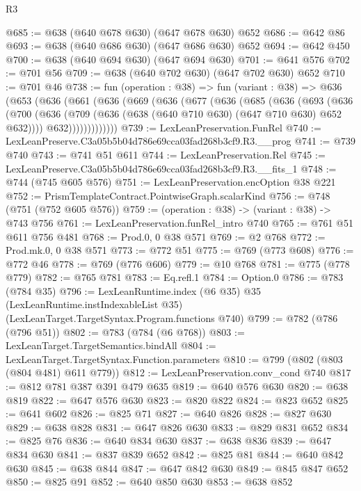 \begin{lexlean}{R3}
\begin{coremodule}
@685 := @638 (@640 @678 @630) (@647 @678 @630) @652
@686 := @642 @86
@693 := @638 (@640 @686 @630) (@647 @686 @630) @652
@694 := @642 @450
@700 := @638 (@640 @694 @630) (@647 @694 @630)
@701 := @641 @576
@702 := @701 @56
@709 := @638 (@640 @702 @630) (@647 @702 @630) @652
@710 := @701 @46
@738 := fun (operation : @38) =>
  fun (variant : @38) =>
  @636
    (@653
      (@636
        (@661
          (@636
            (@669
              (@636
                (@677
                  (@636
                    (@685
                      (@636
                        (@693
                          (@636
                            (@700
                              (@636
                                (@709 (@636 (@638 (@640 @710 @630) (@647 @710 @630) @652 @632))))
                              @632)))))))))))))
@739 := LexLeanPreservation.FunRel
@740 := LexLeanPreserve.C3a05b5b04d786e69cca03fad268b3cf9.R3.__prog
@741 := @739 @740
@743 := @741 @51 @611
@744 := LexLeanPreservation.Rel
@745 := LexLeanPreserve.C3a05b5b04d786e69cca03fad268b3cf9.R3.__fits_1
@748 := @744 (@745 @605 @576)
@751 := LexLeanPreservation.encOption @38 @221
@752 := PrismTemplateContract.PointwiseGraph.scalarKind
@756 := @748 (@751 (@752 @605 @576))
@759 := (operation : @38) -> (variant : @38) -> @743 @756
@761 := LexLeanPreservation.funRel_intro @740
@765 := @761 @51 @611 @756 @481
@768 := Prod.{0, 0} @38 @571
@769 := @2 @768
@772 := Prod.mk.{0, 0} @38 @571
@773 := @772 @51
@775 := @769 (@773 @608)
@776 := @772 @46
@778 := @769 (@776 @606)
@779 := @10 @768
@781 := @775 (@778 @779)
@782 := @765 @781
@783 := Eq.refl.{1}
@784 := Option.{0}
@786 := @783 (@784 @35)
@796 := LexLeanRuntime.index
    (@6 @35)
    @35
    (LexLeanRuntime.instIndexableList @35)
    (LexLeanTarget.TargetSyntax.Program.functions @740)
@799 := @782 (@786 (@796 @51))
@802 := @783 (@784 (@6 @768))
@803 := LexLeanTarget.TargetSemantics.bindAll
@804 := LexLeanTarget.TargetSyntax.Function.parameters
@810 := @799 (@802 (@803 (@804 @481) @611 @779))
@812 := LexLeanPreservation.conv_cond @740
@817 := @812 @781 @387 @391 @479 @635
@819 := @640 @576 @630
@820 := @638 @819
@822 := @647 @576 @630
@823 := @820 @822
@824 := @823 @652
@825 := @641 @602
@826 := @825 @71
@827 := @640 @826
@828 := @827 @630
@829 := @638 @828
@831 := @647 @826 @630
@833 := @829 @831 @652
@834 := @825 @76
@836 := @640 @834 @630
@837 := @638 @836
@839 := @647 @834 @630
@841 := @837 @839 @652
@842 := @825 @81
@844 := @640 @842 @630
@845 := @638 @844
@847 := @647 @842 @630
@849 := @845 @847 @652
@850 := @825 @91
@852 := @640 @850 @630
@853 := @638 @852

\end{coremodule}
\end{lexlean}
